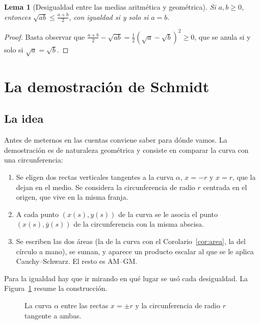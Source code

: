 \documentclass[12pt,a4paper]{article}
\theoremstyle{profesional}
\newtheorem{lemma}[teorema]{Lema}
\theoremstyle{definicion-style}
\begin{document}
\begin{lemma}[Desigualdad entre las medias aritmética y geométrica]\label{lema:amgm}
    Si \( a, b \geq 0 \), entonces \( \sqrt{ab} \leq \frac{a + b}{2} \), con igualdad si y solo si \( a = b \).
\end{lemma}
\begin{proof}
    Basta observar que \( \frac{a + b}{2} - \sqrt{ab} = \frac{1}{2} {(\sqrt{a} - \sqrt{b})}^2 \geq 0 \), que se anula si y solo si \( \sqrt{a} = \sqrt{b} \).
\end{proof}

\newpage
\section{La demostración de Schmidt}\label{sec:schmidt}

\subsection{La idea}

Antes de meternos en las cuentas conviene saber para dónde vamos. La demostración es de naturaleza geométrica y consiste en comparar la curva con una circunferencia:
\begin{enumerate}[label=\arabic*.]
    \item Se eligen dos rectas verticales tangentes a la curva \( \alpha \), \( x = -r \) y \( x = r \), que la dejan en el medio. Se considera la circunferencia de radio \( r \) centrada en el origen, que vive en la misma franja.
    \item A cada punto \( (x(s), y(s)) \) de la curva se le asocia el punto \( (x(s), \bar y(s)) \) de la circunferencia con la misma abscisa.
    \item Se escriben las dos áreas (la de la curva con el Corolario~\ref{cor:area}, la del círculo a mano), se suman, y aparece un producto escalar al que se le aplica Cauchy--Schwarz. El resto es AM--GM.
\end{enumerate}
Para la igualdad hay que ir mirando en qué lugar se usó cada desigualdad. La Figura~\ref{fig:schmidt} resume la construcción.

\begin{figure}[ht]
    \centering
    \caption{La curva \( \alpha \) entre las rectas \( x = \pm r \) y la circunferencia de radio \( r \) tangente a ambas.}\label{fig:schmidt}
\end{figure}
\end{document}
